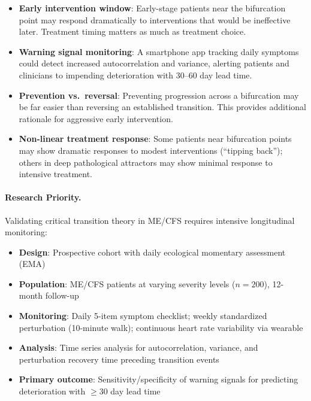 \begin{itemize}
    \item \textbf{Early intervention window}: Early-stage patients near the bifurcation point may respond dramatically to interventions that would be ineffective later. Treatment timing matters as much as treatment choice.

    \item \textbf{Warning signal monitoring}: A smartphone app tracking daily symptoms could detect increased autocorrelation and variance, alerting patients and clinicians to impending deterioration with 30--60 day lead time.

    \item \textbf{Prevention vs.\ reversal}: Preventing progression across a bifurcation may be far easier than reversing an established transition. This provides additional rationale for aggressive early intervention.

    \item \textbf{Non-linear treatment response}: Some patients near bifurcation points may show dramatic responses to modest interventions (``tipping back''); others in deep pathological attractors may show minimal response to intensive treatment.
\end{itemize}

\paragraph{Research Priority.}

Validating critical transition theory in ME/CFS requires intensive longitudinal monitoring:

\begin{itemize}
    \item \textbf{Design}: Prospective cohort with daily ecological momentary assessment (EMA)
    \item \textbf{Population}: ME/CFS patients at varying severity levels ($n = 200$), 12-month follow-up
    \item \textbf{Monitoring}: Daily 5-item symptom checklist; weekly standardized perturbation (10-minute walk); continuous heart rate variability via wearable
    \item \textbf{Analysis}: Time series analysis for autocorrelation, variance, and perturbation recovery time preceding transition events
    \item \textbf{Primary outcome}: Sensitivity/specificity of warning signals for predicting deterioration with $\geq$30 day lead time
\end{itemize}

